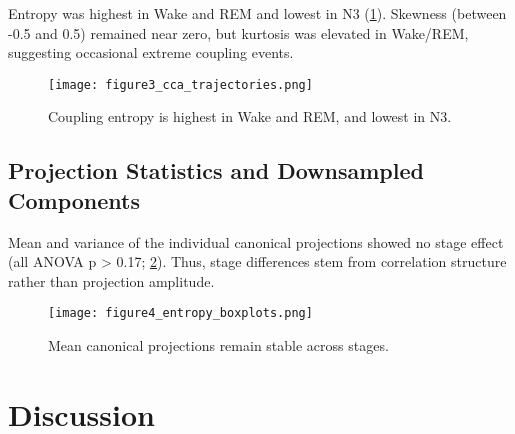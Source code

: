 Entropy was highest in Wake and REM and lowest in N3 (\ref{fig:figure3}). Skewness (between -0.5 and 0.5) remained near zero, but kurtosis was elevated in Wake/REM, suggesting occasional extreme coupling events.

\begin{figure}
\centering
\texttt{[image: figure3\_cca\_trajectories.png]} %
\caption{Coupling entropy is highest in Wake and REM, and lowest in N3.}\label{fig:figure3}
\end{figure}

\subsection{Projection Statistics and Downsampled Components}

Mean and variance of the individual canonical projections showed no stage effect (all ANOVA p > 0.17; \ref{fig:figure4}). Thus, stage differences stem from correlation structure rather than projection amplitude.

\begin{figure}
\centering
\texttt{[image: figure4\_entropy\_boxplots.png]}
\caption{Mean canonical projections remain stable across stages.}\label{fig:figure4}
\end{figure}

\section{Discussion}

